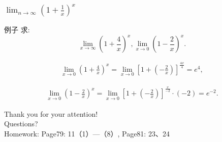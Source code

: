 \documentclass[
10pt,  
aspectratio=43,  
]{beamer}
\begin{document}
\begin{frame}
\frametitle{$\lim_{n\to\infty}\left(1+\frac1x\right)^x$}
\begin{exampleblock}{例子}
求: $$
\lim _{x \rightarrow \infty}\left(1+\frac{4}{x}\right)^x,   \lim _{x \rightarrow 0}\left(1-\frac{2}{x}\right)^x.
$$
\end{exampleblock}

\begin{equation*}
\begin{aligned}
\lim _{x \rightarrow 0}\left(1+\frac{4}{x}\right)^x=\lim _{x \rightarrow 0}\left[1+\left(-\frac{2}{x}\right)\right]^{\frac{4x}{4}}=e^{4},  
\end{aligned}
\end{equation*}


\begin{equation*}
\begin{aligned}
\lim _{x \rightarrow 0}\left(1-\frac{2}{x}\right)^x=\lim _{x \rightarrow 0}\left[1+\left(-\frac{2}{x}\right)\right]^{\frac{x}{-2}} \cdot(-2)=e^{-2}.
\end{aligned}
\end{equation*}
\end{frame}

\begin{frame}[plain]
	\vfill
	\centering
	{
		\centering \Huge \color{white} Thank you for your attention!\\[10pt]Questions?\\Homework: Page79:  11（1）—（8）,   Page81:  23、24
	}
	\vfill
\end{frame}
\end{document}
